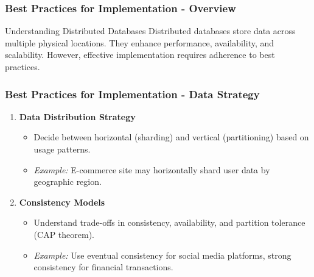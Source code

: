 \documentclass[aspectratio=169]{beamer}
\begin{document}
\begin{frame}[fragile]
    \frametitle{Best Practices for Implementation - Overview}
    \begin{block}{Understanding Distributed Databases}
        Distributed databases store data across multiple physical locations. They enhance performance, availability, and scalability. 
        However, effective implementation requires adherence to best practices.
    \end{block}
\end{frame}

\begin{frame}[fragile]
    \frametitle{Best Practices for Implementation - Data Strategy}
    \begin{enumerate}
        \item \textbf{Data Distribution Strategy}
            \begin{itemize}
                \item Decide between horizontal (sharding) and vertical (partitioning) based on usage patterns.
                \item \textit{Example:} E-commerce site may horizontally shard user data by geographic region.
            \end{itemize}
        
        \item \textbf{Consistency Models}
            \begin{itemize}
                \item Understand trade-offs in consistency, availability, and partition tolerance (CAP theorem).
                \item \textit{Example:} Use eventual consistency for social media platforms, strong consistency for financial transactions.
            \end{itemize}
    \end{enumerate}
\end{frame}
\end{document}
